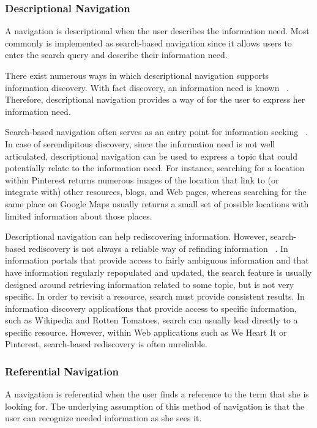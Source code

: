 {{{\subsubsection{Descriptional Navigation}
A navigation is descriptional when the user describes the information need. Most commonly is implemented as search-based navigation since it allows users to enter the search query and describe their information need. 

There exist numerous ways in which descriptional navigation supports information discovery. With fact discovery, an information need is known ~\cite{kellar2006, kellar2007}. Therefore, descriptional navigation provides a way of for the user to express her information need. 

Search-based navigation often serves as an entry point for information seeking ~\cite{levene}. In case of serendipitous discovery, since the information need is not well articulated, descriptional navigation can be used to express a topic that could potentially relate to the information need. For instance, searching for a location within Pinterest returns numerous images of the location that link to (or integrate with) other resources, blogs, and Web pages, whereas searching for the same place on Google Maps usually returns a small set of possible locations with limited information about those places.

Descriptional navigation can help rediscovering information. However, search-based rediscovery is not always a reliable way of refinding information ~\cite{cockburn}. In information portals that provide access to fairly ambiguous information and that have information regularly repopulated and updated, the search feature is usually designed around retrieving information related to some topic, but is not very specific. In order to revisit a resource, search must provide consistent results. In information discovery applications that provide access to specific information, such as Wikipedia and Rotten Tomatoes, search can usually lead directly to a specific resource. However, within Web applications such as We Heart It or Pinterest, search-based rediscovery is often unreliable.
} %

{\subsubsection{Referential Navigation}
A navigation is referential when the user finds a reference to the term that she is looking for.  The underlying assumption of this method of navigation is that the user can recognize needed information as she sees it.

}}}
